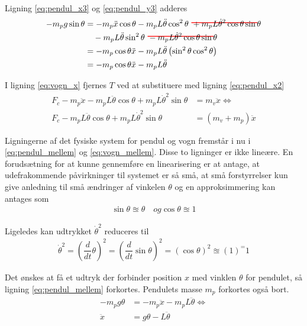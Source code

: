 Ligning \ref{eq:pendul_x3} og \ref{eq:pendul_y3} adderes
\begin{align}
-m_p g \sin{\theta}    &= - m_p \ddot{x}\cos{\theta}
						- m_p L\ddot{\theta}\cos^2\theta\
						\hcancel[red]{+ m_p L \dot{\theta}^2\cos{\theta}\sin{\theta}} \nonumber\\
					   &\quad - m_p L\ddot{\theta}\sin^2\theta\
					    \hcancel[red]{- m_p L \dot{\theta}^2\cos{\theta}\sin{\theta}} \nonumber\\
					   &=- m_p \cos{\theta}\ddot{x} - m_p L \ddot{\theta} \left(\sin^2 \theta \cos^2 \theta \right) \nonumber \\
					   &=- m_p \cos{\theta}\ddot{x} - m_p L \ddot{\theta} \label{eq:pendul_mellem}
\end{align}

I ligning \ref{eq:vogn_x} fjernes $T$ ved at substituere med ligning \ref{eq:pendul_x2}
\begin{align}
F_c - m_p \ddot{x} - m_p L\ddot{\theta}\cos{\theta} + m_p L\dot{\theta}^2\sin{\theta} &= m_v \ddot{x} \Leftrightarrow \nonumber \\
F_c - m_p L\ddot{\theta}\cos{\theta} + m_p L\dot{\theta}^2\sin{\theta} &= (m_v + m_p)  \ddot{x} \label{eq:vogn_mellem}
\end{align}


Ligningerne af det fysiske system for pendul og vogn fremstår i nu i \ref{eq:pendul_mellem} og \ref{eq:vogn_mellem}. Disse to ligninger er ikke lineære. En forudsætning for at kunne gennemføre en linearisering er at antage, at udefrakommende påvirkninger til systemet er så små, at små forstyrrelser kun give anledning til små ændringer af vinkelen $\theta$ og en approksimmering kan antages som
\begin{align}
\sin{\theta} \approxeq \theta \quad og \cos{\theta} \approxeq 1
\end{align} 

Ligeledes kan udtrykket $\dot{\theta}^2$ reduceres til
\begin{align}
\dot{\theta}^2 = \left( \dfrac{d}{dt}\theta \right)^2 =  \left( \dfrac{d}{dt}\sin{\theta} \right)^2 = \left(\cos{\theta}\right)^2 \approxeq (1)^ = 1
\end{align}


Det ønskes at få et udtryk der forbinder position $x$ med vinklen $\theta$ for pendulet, så ligning \ref{eq:pendul_mellem} forkortes. Pendulets masse $m_p$ forkortes også bort. 
\begin{align}
-m_pg\theta &= -m_p\ddot{x}-m_p L \ddot{\theta} \Leftrightarrow\\
\ddot{x} &= g \theta -L \ddot{\theta} \label{eq:pendul_lin}
\end{align}

